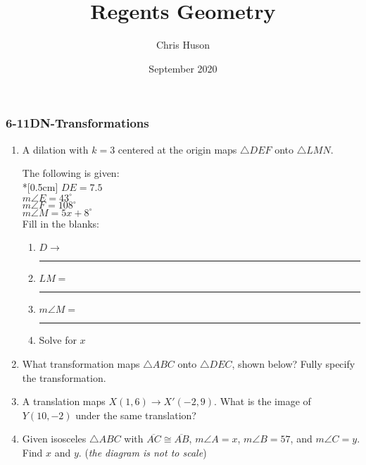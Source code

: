 \documentclass[12pt, twoside]{article}
\title{Regents Geometry}
\author{Chris Huson}
\date{September 2020}
\begin{document}
\subsubsection*{6-11DN-Transformations}
\begin{enumerate}
\item A dilation with $k=3$ centered at the origin maps $\triangle DEF$ onto $\triangle LMN$. \vspace{0.5cm}
    \begin{multicols}{2}
    The following is given:\\*[0.5cm]
      $DE=7.5$ \\
      $m\angle E = 43^\circ$ \\
      $m\angle F = 108^\circ$ \\
      $m\angle M = 5x + 8^\circ$ \\
      Fill in the blanks:
      \begin{enumerate}
        \item $D \rightarrow$ \rule{2cm}{0.15mm}
        \item $LM =$ \rule{2cm}{0.15mm}
        \item $m\angle M =$ \rule{2cm}{0.15mm}
        \item Solve for $x$
      \end{enumerate}
    \end{multicols}  \vspace{3cm}

\item What transformation maps $\triangle ABC$ onto $\triangle DEC$, shown below? Fully specify the transformation. \\[0.25cm]

\item A translation maps $X(1,6) \rightarrow X'(-2,9)$. What is the image of $Y(10,-2)$ under the same translation?

\newpage
\item Given isosceles $\triangle ABC$ with $\overline{AC} \cong \overline{AB}$, $m\angle A = x$, $m\angle B = 57$, and $m\angle C=y$. Find $x$ and $y$. \hfill (\emph{the diagram is not to scale})
  \begin{flushright}
  \end{flushright}


\end{enumerate}
\end{document}
